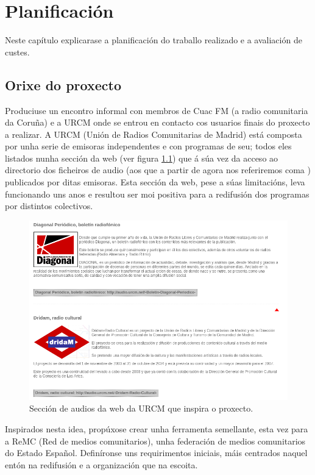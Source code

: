 \chapter[Planificación]{
  \label{chp:plan}
  Planificación
}
\minitoc
\newpage

Neste capítulo explicarase a planificación do traballo realizado e a avaliación de custes.  

\section{Orixe do proxecto}

Produciuse un encontro informal con membros de Cuac FM (a radio comunitaria da Coruña) e a URCM onde se entrou en contacto cos usuarios finais do proxecto a realizar. A URCM (Unión de Radios Comunitarias de Madrid) está composta por unha serie de emisoras independentes e con programas de seu; todos eles listados nunha sección da web (ver figura \ref{fig:urcm}) que á súa vez da acceso ao directorio dos ficheiros de audio (aos que a partir de agora nos referiremos coma ) publicados por ditas emisoras. Esta sección da web, pese a súas limitacións, leva funcionando uns anos e resultou ser moi positiva para a redifusión dos programas por distintos colectivos.

\begin{figure}[h]
	\centering
	\includegraphics[scale=0.55,keepaspectratio=true]{./images/urcm.png}
	\caption{Sección de audios da web da URCM que inspira o proxecto.}
	\label{fig:urcm}
\end{figure}

Inspirados nesta idea, propúxose crear unha ferramenta semellante, esta vez para a ReMC (Red de medios comunitarios), unha federación de medios comunitarios do Estado Español. Definíronse uns requirimentos iniciais, máis centrados naquel entón na
redifusión e a organización que na escoita.

